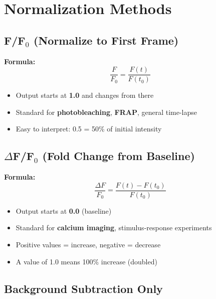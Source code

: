 \documentclass[11pt,a4paper]{article}
\begin{document}
\section{Normalization Methods}

\subsection{F/F$_0$ (Normalize to First Frame)}

\textbf{Formula:}
\begin{equation}
\frac{F}{F_0} = \frac{F(t)}{F(t_0)}
\end{equation}

\begin{itemize}
    \item Output starts at \textbf{1.0} and changes from there
    \item Standard for \textbf{photobleaching}, \textbf{FRAP}, general time-lapse
    \item Easy to interpret: 0.5 = 50\% of initial intensity
\end{itemize}

\subsection{$\Delta$F/F$_0$ (Fold Change from Baseline)}

\textbf{Formula:}
\begin{equation}
\frac{\Delta F}{F_0} = \frac{F(t) - F(t_0)}{F(t_0)}
\end{equation}

\begin{itemize}
    \item Output starts at \textbf{0.0} (baseline)
    \item Standard for \textbf{calcium imaging}, stimulus-response experiments
    \item Positive values = increase, negative = decrease
    \item A value of 1.0 means 100\% increase (doubled)
\end{itemize}

\subsection{Background Subtraction Only}
\end{document}
